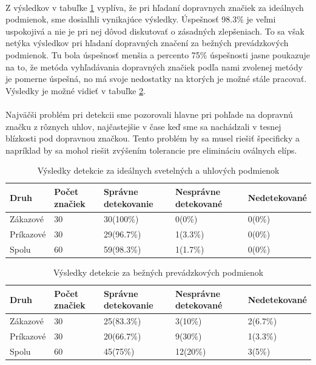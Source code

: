 \documentclass[12pt]{article}
\begin{document}
\paragraph{}
Z výsledkov v tabuľke \ref{idealtest} vyplíva, že pri hľadaní dopravnych značiek za ideálnych podmienok, sme dosialhli vynikajúce výsledky. Úspešnosť 98.3\% je veľmi uspokojivá a nie je pri nej dôvod diskutovať o zásadných zlepšeniach. To sa však netýka výsledkov pri hľadaní dopravných značení za bežných prevádzkových podmienok. Tu bola úspešnosť menšia a percento 75\% úspešnosti jasne poukazuje na to, že metóda vyhľadávania dopravných značiek podľa nami zvolenej metódy je pomerne úspešná, no má svoje nedostatky na ktorých je možné stále pracovať. Výsledky je možné vidieť v tabuľke \ref{nonidealtest}.
\paragraph{}
Najväčši problém pri detekcii sme pozorovali hlavne pri pohľade na dopravnú značku z rôznych uhlov, najčastejšie v čase keď sme sa nachádzali v tesnej blízkosti pod dopravnou značkou. Tento problém by sa musel riešiť špecificky a napríklad by sa mohol riešit zvýšením tolerancie pre elimináciu oválnych elíps.
\begin{table}
	\centering
    \begin{tabular}{ | l | l | l | l | l |}
    \hline
    Druh & Počet značiek & Správne detekovanie & Nesprávne detekované & Nedetekované  \\ \hline
    Zákazové & 30 & 30(100\%) & 0(0\%)  & 0(0\%) \\ \hline
    Príkazové & 30 & 29(96.7\%) & 1(3.3\%)  & 0(0\%) \\ \hline
    Spolu & 60 & 59(98.3\%) & 1(1.7\%)  & 0(0\%) \\ 
    \hline
    \end{tabular}
  	\caption{Výsledky detekcie za ideálnych svetelných a uhlových podmienok}
  	\label{idealtest}
\end{table}

\begin{table}
	\centering
    \begin{tabular}{ | l | l | l | l | l |}
    \hline
    Druh & Počet značiek & Správne detekovanie & Nesprávne detekované & Nedetekované  \\ \hline
    Zákazové & 30 & 25(83.3\%) & 3(10\%)  & 2(6.7\%) \\ \hline
    Príkazové & 30 & 20(66.7\%) & 9(30\%)  & 1(3.3\%) \\ \hline
    Spolu & 60 & 45(75\%) & 12(20\%)  & 3(5\%) \\ 
    \hline
    \end{tabular}
  	\caption{Výsledky detekcie za bežných prevádzkových podmienok}
  	\label{nonidealtest}
\end{table}
\clearpage
\end{document}
